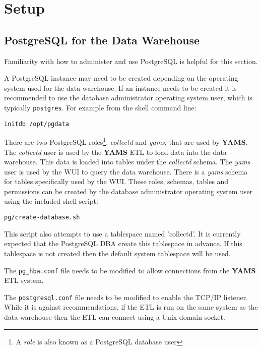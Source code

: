 \documentclass[a4paper,twoside,12pt]{article}
\begin{document}
\section{Setup}

\subsection{PostgreSQL for the Data Warehouse}

Familiarity with how to administer and use PostgreSQL is helpful for this
section.

A PostgreSQL instance may need to be created depending on the operating system
used for the data warehouse.  If an instance needs to be created it is
recommended to use the database administrator operating system user, which is
typically \texttt{postgres}.  For example from the shell command line:
\lstset{language=sh}
\begin{lstlisting}
initdb /opt/pgdata
\end{lstlisting}

There are two PostgreSQL roles\footnote{A \textit{role} is also known as a
PostgreSQL database user}, \textit{collectd} and \textit{yams}, that are used
by \textbf{YAMS}.  The \textit{collectd} user is used by the \textbf{YAMS} ETL
to load data into the data warehouse.  This data is loaded into tables under
the \textit{collectd} schema.  The \textit{yams} user is used by the WUI to
query the data warehouse.  There is a \textit{yams} schema for tables
specifically used by the WUI.  These roles, schemas, tables and permissions can
be created by the database administrator operating system user using the
included shell script:
\lstset{language=sh}
\begin{lstlisting}
pg/create-database.sh
\end{lstlisting}

This script also attempts to use a tablespace named 'collectd'.  It is
currently expected that the PostgreSQL DBA create this tablespace in advance.
If this tablespace is not created then the default system tablespace will be
used.

The \texttt{pg\_hba.conf} file needs to be modified to allow connections from
the \textbf{YAMS} ETL system.

The \texttt{postgresql.conf} file needs to be modified to enable the TCP/IP
listener.  While it is against recommendations, if the ETL is run on the same
system as the data warehouse then the ETL can connect using a Unix-domain
socket.
\end{document}
